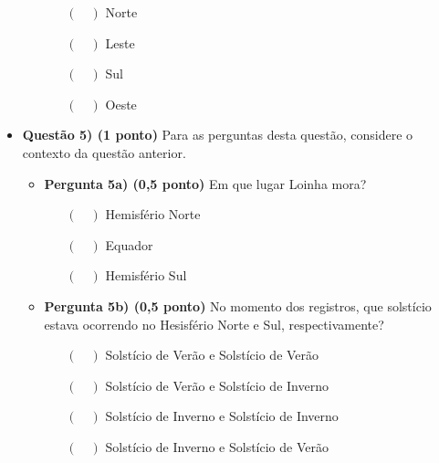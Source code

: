\documentclass[a4paper, 12pt]{article}
\begin{document}
\begin{flushleft}
\begin{itemize}
\begin{itemize}
					\begin{itemize}
						\item[$(\quad)$] Norte
						\item[$(\quad)$] Leste
						\item[$(\quad)$] Sul
						\item[$(\quad)$] Oeste
					\end{itemize} 
			\end{itemize}
		\item \textbf{Questão 5) (1 ponto)} Para as perguntas desta questão, considere o contexto da questão anterior.
			\begin{itemize}
				\item \textbf{Pergunta 5a) (0,5 ponto)} Em que lugar Loinha mora?
					\begin{itemize}
						\item[$(\quad)$] Hemisfério Norte
						\item[$(\quad)$] Equador
						\item[$(\quad)$] Hemisfério Sul
					\end{itemize}
				\item \textbf{Pergunta 5b) (0,5 ponto)} No momento dos registros, que solstício estava ocorrendo no Hesisfério Norte e Sul, respectivamente?
					\begin{itemize}
						\item[$(\quad)$] Solstício de Verão e Solstício de Verão
						\item[$(\quad)$] Solstício de Verão e Solstício de Inverno
						\item[$(\quad)$] Solstício de Inverno e Solstício de Inverno
						\item[$(\quad)$] Solstício de Inverno e Solstício de Verão
					\end{itemize}
			\end{itemize}
	\end{itemize}
	\end{flushleft}
\end{document}
